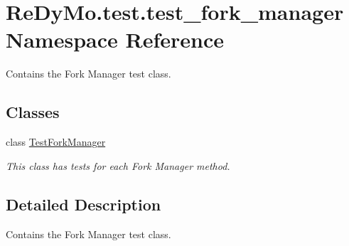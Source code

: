 \hypertarget{namespaceReDyMo_1_1test_1_1test__fork__manager}{}\section{Re\+Dy\+Mo.\+test.\+test\+\_\+fork\+\_\+manager Namespace Reference}
\label{namespaceReDyMo_1_1test_1_1test__fork__manager}


Contains the Fork Manager test class.  


\subsection*{Classes}
\begin{DoxyCompactItemize}
\item 
class \mbox{\hyperlink{classReDyMo_1_1test_1_1test__fork__manager_1_1TestForkManager}{Test\+Fork\+Manager}}
\begin{DoxyCompactList}\small\item\em This class has tests for each Fork Manager method. \end{DoxyCompactList}\end{DoxyCompactItemize}


\subsection{Detailed Description}
Contains the Fork Manager test class. 